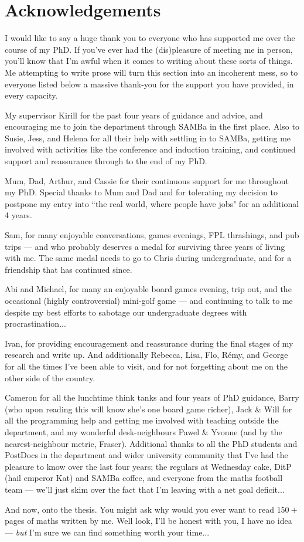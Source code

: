 \chapter*{Acknowledgements}
I would like to say a huge thank you to everyone who has supported me over the course of my PhD.
If you've ever had the (dis)pleasure of meeting me in person, you'll know that I'm awful when it comes to writing about these sorts of things.
Me attempting to write prose will turn this section into an incoherent mess, so to everyone listed below a massive thank-you for the support you have provided, in every capacity.

My supervisor Kirill for the past four years of guidance and advice, and encouraging me to join the department through SAMBa in the first place.
Also to Susie, Jess, and Helena for all their help with settling in to SAMBa, getting me involved with activities like the conference and induction training, and continued support and reassurance through to the end of my PhD.

Mum, Dad, Arthur, and Cassie for their continuous support for me throughout my PhD.
Special thanks to Mum and Dad and for tolerating my decision to postpone my entry into ``the real world, where people have jobs" for an additional 4 years.

Sam, for many enjoyable conversations, games evenings, FPL thrashings, and pub trips --- and who probably deserves a medal for surviving three years of living with me. 
The same medal needs to go to Chris during undergraduate, and for a friendship that has continued since.

Abi and Michael, for many an enjoyable board games evening, trip out, and the occasional (highly controversial) mini-golf game --- and continuing to talk to me despite my best efforts to sabotage our undergraduate degrees with procrastination...

Ivan, for providing encouragement and reassurance during the final stages of my research and write up. 
And additionally Rebecca, Lisa, Flo, R\'{e}my, and George for all the times I've been able to visit, and for not forgetting about me on the other side of the country.

Cameron for all the lunchtime think tanks and four years of PhD guidance, Barry (who upon reading this will know she's one board game richer), Jack \& Will for all the programming help and getting me involved with teaching outside the department, and my wonderful desk-neighbours Pawel \& Yvonne (and by the nearest-neighbour metric, Fraser).
Additional thanks to all the PhD students and PostDocs in the department and wider university community that I've had the pleasure to know over the last four years; the regulars at Wednesday cake, DitP (hail emperor Kat) and SAMBa coffee, and everyone from the maths football team --- we'll just skim over the fact that I'm leaving with a net goal deficit... 

And now, onto the thesis.
You might ask why would you ever want to read $150+$ pages of maths written by me.
Well look, I'll be honest with you, I have no idea --- \emph{but} I'm sure we can find something worth your time...